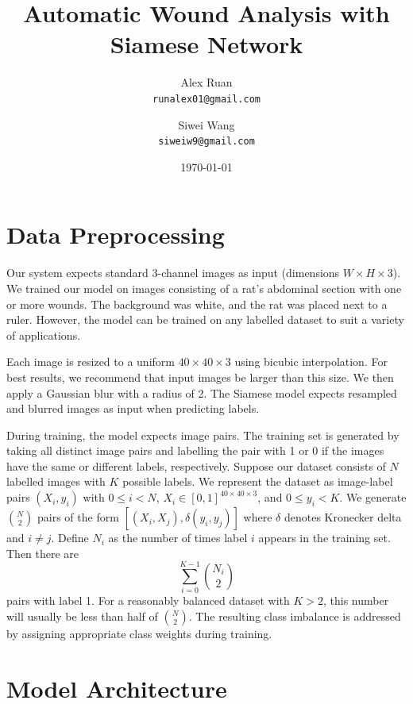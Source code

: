 \documentclass[12pt]{article}
\title{Automatic Wound Analysis with Siamese Network}
\author{Alex Ruan \\ \texttt{runalex01@gmail.com} \and Siwei Wang \\ \texttt{siweiw9@gmail.com}}
\date{\today}
\begin{document}
\maketitle
\onehalfspacing

\section{Data Preprocessing} \label{sec:data_preprocessing}

Our system expects standard 3-channel images as input (dimensions \(W \times H \times 3\)). We trained our model on images consisting of a rat's abdominal section with one or more wounds. The background was white, and the rat was placed next to a ruler. However, the model can be trained on any labelled dataset to suit a variety of applications.

Each image is resized to a uniform \(40 \times 40 \times 3\) using bicubic interpolation. For best results, we recommend that input images be larger than this size. We then apply a Gaussian blur with a radius of 2. The Siamese model expects resampled and blurred images as input when predicting labels.

During training, the model expects image pairs. The training set is generated by taking all distinct image pairs and labelling the pair with 1 or 0 if the images have the same or different labels, respectively. Suppose our dataset consists of \(N\) labelled images with \(K\) possible labels. We represent the dataset as image-label pairs \((X_i, y_i)\) with \(0 \leq i < N\), \(X_i \in [0, 1]^{40 \times 40 \times 3}\), and \(0 \leq y_i < K\). We generate \(\binom{N}{2}\) pairs of the form \([(X_i, X_j), \delta(y_i, y_j)]\) where \(\delta\) denotes Kronecker delta and \(i \neq j\). Define \(N_i\) as the number of times label \(i\) appears in the training set. Then there are
\begin{equation}
    \sum_{i = 0}^{K - 1} \binom{N_i}{2} \label{eq:same_pairs}
\end{equation}
pairs with label 1. For a reasonably balanced dataset with \(K > 2\), this number will usually be less than half of \(\binom{N}{2}\). The resulting class imbalance is addressed by assigning appropriate class weights during training.

\section{Model Architecture} \label{sec:model_architecture}
\end{document}
